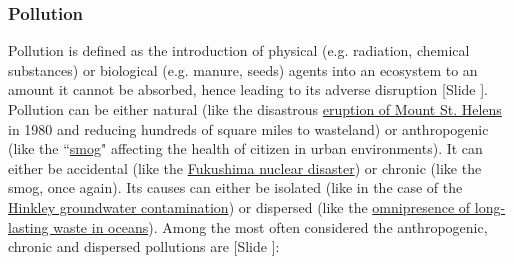 \documentclass{article}
\newcounter{slide}
\begin{document}
\subsubsection{Pollution}
\label{sec:pollution}
Pollution is defined as the introduction of physical (e.g. radiation, chemical substances) or biological (e.g. manure, seeds) agents into an ecosystem to an amount it cannot be absorbed, hence leading to its adverse disruption {\color{blue}[Slide ]}. Pollution can be either natural (like the disastrous \href{https://en.wikipedia.org/wiki/1980_eruption_of_Mount_St._Helens}{eruption of Mount St. Helens} in 1980 and reducing hundreds of square miles to wasteland) or anthropogenic (like the ``\href{https://en.wikipedia.org/wiki/Smog}{smog}" affecting the health of citizen in urban environments). It can either be accidental (like the \href{https://en.wikipedia.org/wiki/Fukushima_Daiichi_nuclear_disaster}{Fukushima nuclear disaster}) or chronic (like the smog, once again). Its causes can either be isolated (like in the case of the \href{https://en.wikipedia.org/wiki/Hinkley_groundwater_contamination}{Hinkley groundwater contamination}) or dispersed (like the \href{https://en.wikipedia.org/wiki/Marine_debris}{omnipresence of long-lasting waste in oceans}). Among the most often considered the anthropogenic, chronic and dispersed pollutions are {\color{blue}[Slide ]}:
\end{document}
